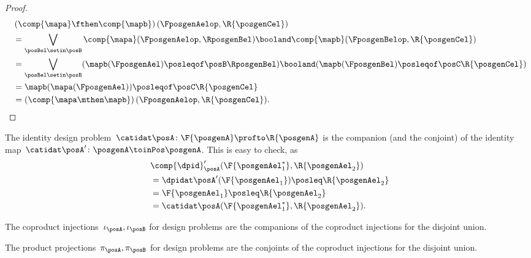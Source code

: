 \begin{proof}
    \begin{equation}
        \begin{aligned}
            ~ & \left(\comp{\mapa}\fthen \comp{\mapb}\right)(\FposgenAelop,\R{\posgenCel}) \\
              & =\bigvee_{\posBel\setin \posB} \comp{\mapa}(\FposgenAelop,\RposgenBel)\booland\comp{\mapb}(\FposgenBelop,\R{\posgenCel}) \\%
              & =\bigvee_{\posBel\setin \posB} (\mapb(\FposgenAel)\posleqof\posB \RposgenBel)\booland (\mapb(\FposgenBel)\posleqof\posC \R{\posgenCel}) \\
              & =\mapb(\mapa(\FposgenAel))\posleqof\posC \R{\posgenCel} \\
              & =\left(\comp{\mapa\mthen \mapb}\right)(\FposgenAelop,\R{\posgenCel}).
        \end{aligned}
    \end{equation}
\end{proof}

\begin{example}
    The identity design problem~$\catidat\posA\colon \F{\posgenA} \profto \R{\posgenA}$ is the companion (and the conjoint) of the identity map~$\catidat\posA'\colon \posgenA \toinPos \posgenA$.
    This is easy to check, as
    \begin{equation}
        \begin{aligned}
            ~ & \comp{\dpid}_\posA'(\F{\posgenAel_1^*},\R{\posgenAel_2}) \\
              & =\dpidat\posA'(\F{\posgenAel_1})\posleq \R{\posgenAel_2} \\
              & =\F{\posgenAel_1}\posleq \R{\posgenAel_2} \\
              & =\catidat\posA(\F{\posgenAel_1^*},\R{\posgenAel_2}).
        \end{aligned}
    \end{equation}
\end{example}

\begin{example}
    The coproduct injections~$\iota_\posA, \iota_\posB$ for design problems are the companions of the coproduct injections for the disjoint union.
\end{example}

\begin{example}
    The product projections~$\pi_\posA, \pi_\posB$ for design problems are the conjoints of the coproduct injections for the disjoint union.
\end{example}

